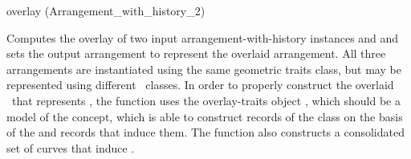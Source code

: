 
\ccRefPageBegin

\begin{ccRefFunction}{overlay (Arrangement_with_history_2)}



   {Computes the overlay of two input arrangement-with-history instances
     and  and sets the output arrangement 
    to represent the overlaid arrangement. All three arrangements are
    instantiated using the same geometric traits class, but may be represented
    using different \dcel\ classes. In order to properly construct the
    overlaid \dcel\ that represents , the function uses the
    overlay-traits object , which should be a model of the
     concept, which is able to construct records of the
     class on the basis of the  and 
    records that induce them. The function also constructs a consolidated set
    of curves that induce .}

\ccSeeAlso

\end{ccRefFunction}

\ccRefPageEnd
